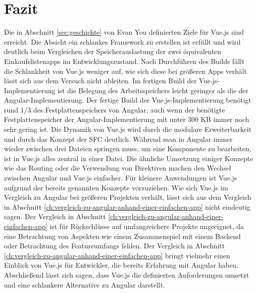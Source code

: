 

\chapter{Fazit}
Die in Abschnitt \ref{sec:geschichte} von Evan You definierten Ziele für Vue.js sind erreicht.
Die Absicht ein schlankes Framework zu erstellen ist erfüllt und wird deutlich beim Vergleichen der Speicherauslastung
der zwei äquivalenten Einkaufslistenapps im Entwicklungszustand.
Nach Durchführen des Builds fällt die Schlankheit von Vue.js weniger auf,
wie sich diese bei größeren Apps verhält lässt sich aus dem Versuch nicht ableiten.
Im fertigen Build der Vue.js-Implementierung ist die Belegung des Arbeitsspeichers leicht geringer als die der Angular-Implementierung.
Der fertige Build der Vue.js-Implementierung benötigt rund 1/3 des Festplattenspeichers von Angular,
auch wenn der benötigte Festplattenspeicher der Angular-Implementierung mit unter 300 KB immer noch sehr gering ist.
Die Dynamik von Vue.js wird durch die modulare Erweiterbarkeit und durch das
Konzept der SFC deutlich.
Während man in Angular immer wieder zwischen drei Dateien springen muss, um eine Komponente zu bearbeiten,
ist in Vue.js alles zentral in einer Datei.
Die ähnliche Umsetzung einiger Konzepte wie das Routing oder die Verwendung von Direktiven machen
den Wechsel zwischen Angular und Vue.js einfacher.
Für kleinere Anwendungen ist Vue.js aufgrund der bereits genannten Konzepte vorzuziehen.
Wie sich Vue.js im Vergleich zu Angular bei größeren Projekten verhält, lässt sich aus dem Vergleich
in Abschnitt \ref{ch:vergleich-zu-angular-anhand-einer-einfachen-app} nicht eindeutig sagen.
Der Vergleich in Abschnitt \ref{ch:vergleich-zu-angular-anhand-einer-einfachen-app} ist für Rückschlüsse
auf umfangreichere Projekte ungeeignet, da eine Betrachtung von Aspekten wie einem Zusammenspiel mit einem Backend
oder Betrachtung des Featureumfangs fehlen.
Der Vergleich in Abschnitt \ref{ch:vergleich-zu-angular-anhand-einer-einfachen-app} bringt vielmehr einen
Einblick von Vue.js für Entwickler, die bereits Erfahrung mit Angular haben.
Abschließend lässt sich sagen, dass Vue.js die definierten
Anforderungen umsetzt und eine schlankere Alternative zu Angular
darstellt.
